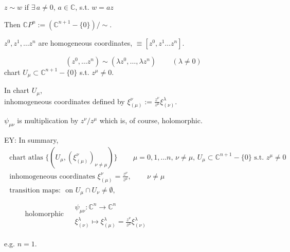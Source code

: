 \documentclass[twoside]{amsart}
\begin{document}
$z\sim w$ if $\exists \, a \neq 0$, $a\in \mathbb{C}$, s.t. $w=az$

Then $\mathbb{C}P^n := (\mathbb{C}^{n+1} - \lbrace 0 \rbrace ) /\sim$.

$z^0, z^1, \dots z^n$ are homogeneous coordinates, $\equiv [ z^0, z^1 \dots z^n ]$.

\[
(z^0 , \dots z^n) \sim (\lambda z^0, \dots , \lambda z^n) \qquad \, (\lambda \neq 0)
\]
chart $U_{\mu} \subset \mathbb{C}^{n+1}-\lbrace 0 \rbrace$ s.t. $z^{\mu} \neq 0$.

In chart $U_{\mu}$, \\
inhomogeneous coordinates defined by $\xi^{\nu}_{ (\mu)} := \frac{z^{\nu}}{ z^{\mu} } \xi^{\lambda}_{ (\nu) }$.

$\psi_{ \mu \nu}$ is multiplication by $z^{\nu}/ z^{\mu}$ which is, of course, holomorphic.

EY: In summary, 
\begin{equation}
\begin{gathered}
  \text{ chart atlas } \lbrace (U_{\mu}, (\xi^{\nu}_{ (\mu) } )_{ \nu \neq \mu } ) \rbrace \qquad \, \mu = 0 , 1 , \dots n, \, \nu \neq \mu , \, U_{\mu} \subset \mathbb{C}^{n+1}- \lbrace 0 \rbrace \text{ s.t. } z^{\mu} \neq 0 \\
\text{ inhomogeneous coordinates } \xi_{ (\mu) }^{\nu} = \frac{ z^{\nu} }{ z^{\mu}} , \qquad \, \nu \neq \mu \\
\text{ transition maps: } \text{ on } U_{\mu} \cap U_{\nu} \neq \emptyset , \\
\qquad \, \text{ holomorphic } \begin{aligned} & \quad \\
  &  \psi_{\mu \nu} : \mathbb{C}^n \to \mathbb{C}^n \\
  & \xi^{\lambda}_{ (\nu  ) } \mapsto \xi^{\lambda}_{( \mu ) } = \frac{z^{\nu} }{ z^{\mu} } \xi^{\lambda}_{(\nu) }
  \end{aligned}
  \end{gathered}
\end{equation}


e.g. $n=1$.
\end{document}
